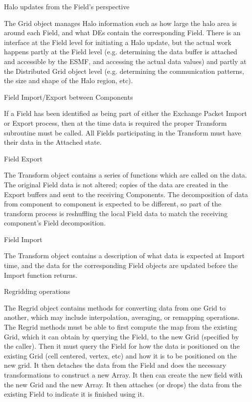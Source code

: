 \begin{description}

\item{Halo updates from the Field's perspective}

The Grid object manages Halo information such as how large the
halo area is around each Field, and what DEs contain the
corresponding Field.  There is an interface at the Field level
for initiating a Halo update, but the actual work happens
partly at the Field level (e.g. determining the data buffer is
attached and accessible by the ESMF, and accessing
the actual data values) and partly at the Distributed Grid
object level (e.g. determining the communication patterns, the
size and shape of the Halo region, etc).

\item{Field Import/Export between Components}

If a Field has been identified as being part of either the
Exchange Packet Import or Export process, then at the time
data is required the proper Transform subroutine must be 
called.  All Fields participating in the Transform must have
their data in the Attached state.  

\item{Field Export}

The Transform object contains
a series of functions which are called on the data.  The
original Field data is not altered; copies of the data are
created in the Export buffers and sent to the receiving
Components.  The decomposition of data from component to
component is expected to be different, so part of the transform
process is reshuffling the local Field data to match the
receiving component's Field decomposition.

\item{Field Import}

The Transform object contains a description of what data is
expected at Import time, and the data for the corresponding
Field objects are updated before the Import function returns.

\item{Regridding operations}

The Regrid object contains methods for converting data from
one Grid to another, which may include interpolation, averaging,
or remapping operations.  The Regrid methods must be able to
first compute the map from the existing Grid, which it can
obtain by querying the Field, to the new Grid (specified by
the caller).  Then it must query the Field for how the data
is positioned on the existing Grid (cell centered, vertex, etc)
and how it is to be positioned on the new grid.  It then detaches
the data from the Field and does the necessary transformations
to construct a new Array.  It then can create the new field
with the new Grid and the new Array.  It then attaches
(or drops) the data from the existing Field to indicate it is
finished using it.


\end{description}
